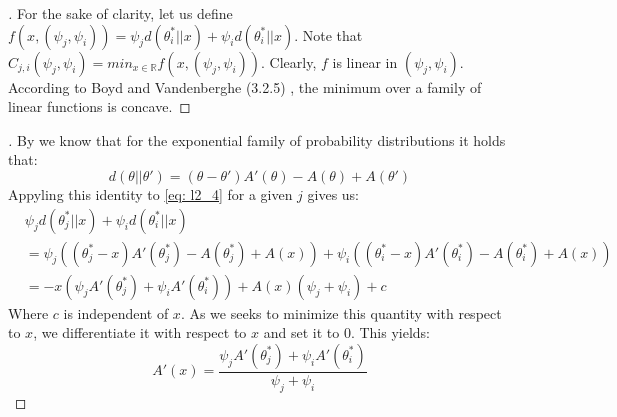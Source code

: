 \begin{proof}[]
  For the sake of clarity, let us define $f(x, (\psi_j, \psi_i)) = \psi_j d(\theta_i^*||x) + \psi_i d(\theta_i^* || x)$. Note that $C_{j, i}(\psi_j, \psi_i) = min_{x \in \mathbb{R}} f(x,(\psi_j, \psi_i))$. Clearly, $f$ is linear in $(\psi_j, \psi_i)$. According to Boyd and Vandenberghe (3.2.5) \cite{Boyd:2004:CO:993483}, the minimum over a family of linear functions is concave.
\end{proof}

\begin{proof}[]
  By  we know that for the exponential family of probability distributions it holds that:
  \[d(\theta||\theta') = (\theta - \theta')A'(\theta) - A(\theta) + A(\theta')\]
  Appyling this identity to \eqref{eq: l2_4} for a given $j$ gives us:
  \begin{align}
    &\psi_{j}d(\theta^*_{j} || x) + \psi_{i}d(\theta_{i}^* ||x) \\
    &=\psi_j ((\theta_j^* - x)A'(\theta_j^*) - A(\theta_j^*) + A(x)) + \psi_i((\theta_i^* - x)A'(\theta_i^*) - A(\theta_i^*) + A(x))\\
    &= -x(\psi_j A'(\theta_j^*) + \psi_i A'(\theta_i^*)) + A(x)(\psi_j + \psi_i) + c
  \end{align}
  Where $c$ is independent of $x$. As we seeks to minimize this quantity with respect to $x$, we differentiate it with respect to $x$ and set it to 0. This yields:
  \[A'(x) = \frac{\psi_j A'(\theta_j^*) + \psi_i A'(\theta_i^*)}{\psi_j + \psi_i}\]
\end{proof}

